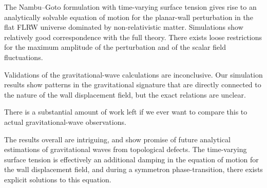 








The Nambu--Goto formulation with time-varying surface tension gives rise to an analytically solvable equation of motion for the planar-wall perturbation in the flat FLRW universe dominated by non-relativistic matter. Simulations show relatively good correspondence with the full theory. There exists loose restrictions for the maximum amplitude of the perturbation and of the scalar field fluctuations. 

Validations of the gravitational-wave calculations are inconclusive. Our simulation results show patterns in the gravitational signature that are directly connected to the nature of the wall displacement field, but the exact relations are unclear. 

There is a substantial amount of work left if we ever want to compare this to actual gravitational-wave observations.


The results overall are intriguing, and show promise of future analytical estimations of gravitational waves from topological defects. The time-varying surface tension is effectively an additional damping in the equation of motion for the wall displacement field, and during a symmetron phase-transition, there exists explicit solutions to this equation.





